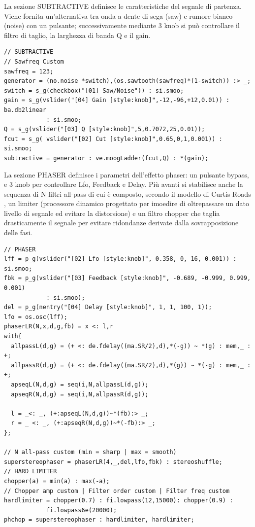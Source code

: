 \documentclass[
	a4paper,
	twocolumn
	]{article}
\begin{document}
La sezione SUBTRACTIVE definisce le caratteristiche del segnale di partenza.
Viene fornita un'alternativa tra onda a dente di sega (saw) e rumore bianco
(noise) con un pulsante; successivamente mediante 3 knob si può controllare il
filtro di taglio, la larghezza di banda Q e il gain.

\begin{lstlisting}
// SUBTRACTIVE
// Sawfreq Custom
sawfreq = 123;
generator = (no.noise *switch),(os.sawtooth(sawfreq)*(1-switch)) :> _;
switch = s_g(checkbox("[01] Saw/Noise")) : si.smoo;
gain = s_g(vslider("[04] Gain [style:knob]",-12,-96,+12,0.01)) : ba.db2linear
			: si.smoo;
Q = s_g(vslider("[03] Q [style:knob]",5,0.7072,25,0.01));
fcut = s_g( vslider("[02] Cut [style:knob]",0.65,0,1,0.001)) : si.smoo;
subtractive = generator : ve.moogLadder(fcut,Q) : *(gain);
\end{lstlisting}

La sezione PHASER definisce i parametri dell'effetto phaser: un pulsante bypass,
e 3 knob per controllare Lfo, Feedback e Delay. Più avanti si stabilisce anche
la sequenza di N filtri all-pass di cui è composto, secondo il modello di Curtis
Roads \cite{cr96cmt}, un limiter (processore dinamico progettato per imoedire di
oltrepassare un dato livello di segnale ed evitare la distorsione) e un filtro
chopper che taglia drasticamente il segnale per evitare ridondanze derivate
dalla sovrapposizione delle fasi.

\begin{lstlisting}
// PHASER
lff = p_g(vslider("[02] Lfo [style:knob]", 0.358, 0, 16, 0.001)) : si.smoo;
fbk = p_g(vslider("[03] Feedback [style:knob]", -0.689, -0.999, 0.999, 0.001)
			: si.smoo);
del = p_g(nentry("[04] Delay [style:knob]", 1, 1, 100, 1));
lfo = os.osc(lff);
phaserLR(N,x,d,g,fb) = x <: l,r
with{
  allpassL(d,g) = (+ <: de.fdelay((ma.SR/2),d),*(-g)) ~ *(g) : mem,_ : +;
  allpassR(d,g) = (+ <: de.fdelay((ma.SR/2),d),*(g)) ~ *(-g) : mem,_ : +;
  apseqL(N,d,g) = seq(i,N,allpassL(d,g));
  apseqR(N,d,g) = seq(i,N,allpassR(d,g));

  l = _<: _, (+:apseqL(N,d,g))~*(fb):> _;
  r = _ <: _, (+:apseqR(N,d,g))~*(-fb):> _;
};

// N all-pass custom (min = sharp | max = smooth)
superstereophaser = phaserLR(4,_,del,lfo,fbk) : stereoshuffle;
// HARD LIMITER
chopper(a) = min(a) : max(-a);
// Chopper amp custom | Filter order custom | Filter freq custom
hardlimiter = chopper(0.7) : fi.lowpass(12,15000): chopper(0.9) :
			fi.lowpass6e(20000);
phchop = superstereophaser : hardlimiter, hardlimiter;
\end{lstlisting}
\end{document}

